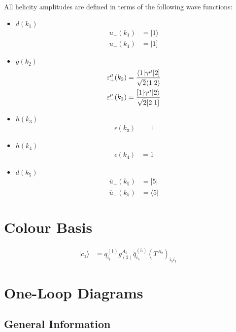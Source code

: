 \documentclass[a4paper]{article}
\newcommand{\bra}[1]{\langle #1 \vert}
\newcommand{\brb}[1]{[ #1 \vert}
\newcommand{\kea}[1]{\vert #1 \rangle}
\newcommand{\keb}[1]{\vert #1 ]}
\newcommand{\Spaa}[1]{\langle #1 \rangle}
\newcommand{\Spab}[1]{\langle #1]}
\newcommand{\Spba}[1]{[ #1 \rangle}
\newcommand{\Spbb}[1]{[ #1 ]}
\begin{document}
All helicity amplitudes are defined in terms of the following wave functions:
\begin{itemize}
\item $d(k_{1})$ 
\begin{align}
u_+(k_{1}) &= \kea{1}\\
u_-(k_{1}) &= \keb{1}
\end{align}
\item $g(k_{2})$ 
\begin{align}
\varepsilon^\mu_+(k_{2}) &=
   \frac{\Spab{1\vert\gamma^\mu\vert 2}}{%
   \sqrt{2}\Spaa{1\vert 2}}\\
\varepsilon^\mu_-(k_{2}) &=
   \frac{\Spba{1\vert\gamma^\mu\vert 2}}{%
   \sqrt{2}\Spbb{2\vert 1}}
\end{align}
\item $h(k_3)$ 
\begin{align}
\epsilon(k_{3}) &= 1
\end{align}
\item $h(k_4)$ 
\begin{align}
\epsilon(k_{4}) &= 1
\end{align}
\item $d(k_5)$ 
\begin{align}
\bar{u}_+(k_{5}) &= \brb{5}\\
\bar{u}_-(k_{5}) &= \bra{5}
\end{align}
\end{itemize}

\section{Colour Basis}
\begin{align}
\vert c_{1}\rangle &=q_{i_{1}}^{(1)}g^{A_{2}}_{(2)}\bar{q}_{i_{5}}^{(5)}\left(T^{A_{2}}\right)_{i_{5}i_{1}}
\end{align}




\section{One-Loop Diagrams}
\subsection*{General Information}

\end{document}
